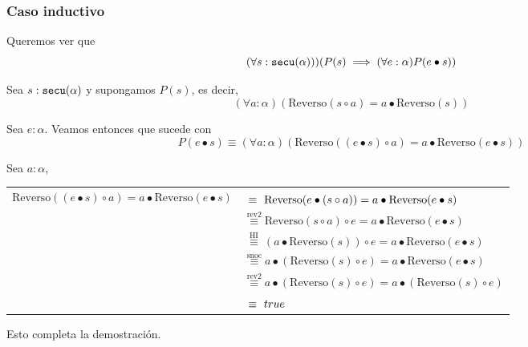 \documentclass[hidelinks,a4paper,10pt, nofootinbib]{article}
\newcommand{\secu}{\ensuremath\texttt{secu}(\alpha)}
\newcommand{\rev}{\text{Reverso}}
\newcommand{\cons}{\bullet}
\newcommand{\snoc}{\circ}
\newcommand{\por}[1]{\overset{\text{#1}}{\equiv}}
\newcommand{\ph}{\phantom{rev1}}
\begin{document}
\subsubsection*{Caso inductivo}
Queremos ver que \[(\forall s : \secu))(P(s) \implies (\forall e : \alpha) P(e \cons s)) \]



Sea $s : \secu$ y supongamos $P(s)$, es decir, \[(\forall a : \alpha) (\rev(s \circ a) = a \cons \rev(s))\]
\vspace{1em}

Sea $e : \alpha$. Veamos entonces que sucede con \[P(e \cons s) \equiv (\forall a : \alpha) (\rev((e \cons s) \circ a) = a \cons \rev(e \cons s))\]

Sea $ a : \alpha$, 
\begin{center}
\begin{tabular}{r l}
$\rev((e \cons s) \snoc a) = a \cons \rev(e \cons s)$ & $\por{\ph} \rev(e \cons (s \snoc a)) = a \cons \rev(e \cons s)$ \\
               & $\por{rev2} \rev(s \snoc a) \snoc e= a \cons \rev(e \cons s)$ \\
               & $\por{ HI } (a \cons \rev(s)) \snoc e= a \cons \rev(e \cons s)$ \\
               & $\por{snoc} a \cons (\rev(s) \snoc e) = a \cons \rev(e \cons s)$ \\
               & $\por{rev2} a \cons (\rev(s) \snoc e) = a \cons (\rev(s) \snoc e)$ \\
               & $\por{\ph} true$ \\
\end{tabular}
\end{center}


Esto completa la demostración.
\end{document}
